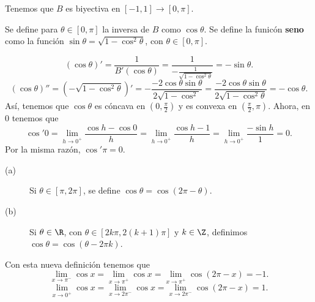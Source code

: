 \begin{observation}
	\normalfont Tenemos que $\displaystyle B $ es biyectiva en $\displaystyle \left[-1,1\right] \to \left[0,\pi \right]  $.
\end{observation}
\begin{fdefinition}
	\normalfont Se define para $\displaystyle \theta \in [0,\pi] $ la inversa de $\displaystyle B $ como $\displaystyle \cos\theta $. Se define la funicón \textbf{seno} como la función $\displaystyle \sin\theta = \sqrt{1 - \cos^{2}\theta} $, con $\displaystyle \theta \in [0,\pi] $.
\end{fdefinition}
\begin{observation}
\normalfont 
\[\left(\cos\theta\right)' = \frac{1}{B'\left(\cos\theta \right)} = \frac{1}{-\frac{1}{\sqrt{1-\cos^{2}\theta}}} = - \sin \theta .\]
\[\left(\cos\theta\right)'' = \left(-\sqrt{1 - \cos^{2}\theta}\right)'= -\frac{-2\cos\theta\sin\theta}{2\sqrt{1-\cos^{2}}} = \frac{-2\cos\theta\sin\theta}{2\sqrt{1 - \cos^{2}\theta}} = - \cos\theta .\]
Así, tenemos que $\displaystyle \cos\theta $ es cóncava en $\displaystyle \left(0,\frac{\pi }{2}\right) $ y es convexa en $\displaystyle \left(\frac{\pi }{2}, \pi \right) $. Ahora, en 0 tenemos que
\[\cos'0 = \lim_{h \to 0^{+}}\frac{\cos h - \cos0}{h} = \lim_{h \to 0^{+}}\frac{\cos h - 1}{h } = \lim_{h \to 0^{+}}\frac{-\sin h}{1} = 0 .\]
Por la misma razón, $\displaystyle \cos'\pi = 0 $.
\end{observation}
\begin{fdefinition}[]
\normalfont 
\begin{description}
	\item[(a)] Si $\displaystyle \theta \in \left[\pi, 2\pi \right]  $, se define $\displaystyle \cos\theta = \cos\left(2\pi - \theta\right) $.
	\item[(b)] Si $\displaystyle \theta \in \R $, con $\displaystyle \theta \in \left[2k\pi, 2\left(k+1\right)\pi \right]  $ y $\displaystyle k \in \Z $, definimos $\displaystyle \cos\theta = \cos\left(\theta - 2\pi k\right) $.
\end{description}
\end{fdefinition}
\begin{observation}
\normalfont Con esta nueva definición tenemos que
\[\lim_{x \to \pi^{-}}\cos x = \lim_{x \to \pi^{+}}\cos x =  \lim_{x \to \pi^{+}}\cos\left(2\pi - x\right) = -1.\]
\[\lim_{x \to 0^{+}}\cos x = \lim_{x \to 2\pi^{-}}\cos x = \lim_{x \to 2\pi^{-}}\cos\left(2\pi - x\right) = 1 .\]
\end{observation}
